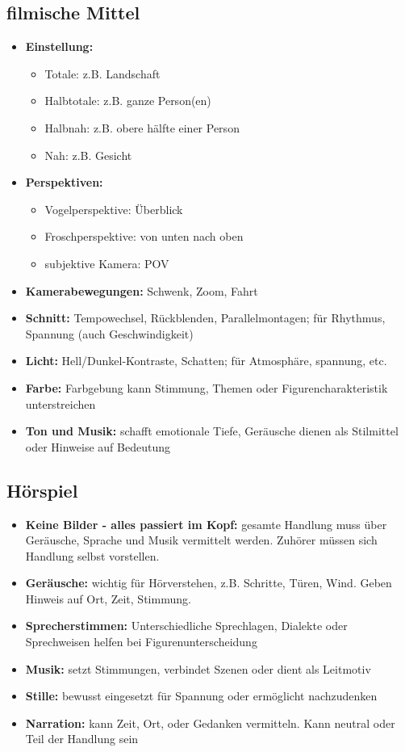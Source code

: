 \subsection{filmische Mittel}
\begin{itemize}
    \item \textbf{Einstellung:} 
        \begin{itemize}
            \item Totale: z.B. Landschaft
            \item Halbtotale: z.B. ganze Person(en)
            \item Halbnah: z.B. obere hälfte einer Person
            \item Nah: z.B. Gesicht
        \end{itemize}
    \item \textbf{Perspektiven:}
        \begin{itemize}
            \item Vogelperspektive: Überblick
            \item Froschperspektive: von unten nach oben
            \item subjektive Kamera: POV
        \end{itemize}
    \item \textbf{Kamerabewegungen:} Schwenk, Zoom, Fahrt
    \item \textbf{Schnitt:} Tempowechsel, Rückblenden, Parallelmontagen; für Rhythmus, Spannung (auch Geschwindigkeit)
    \item \textbf{Licht:} Hell/Dunkel-Kontraste, Schatten; für Atmosphäre, spannung, etc.
    \item \textbf{Farbe:} Farbgebung kann Stimmung, Themen oder Figurencharakteristik unterstreichen
    \item \textbf{Ton und Musik:} schafft emotionale Tiefe, Geräusche dienen als Stilmittel oder Hinweise auf Bedeutung
\end{itemize}


\subsection{Hörspiel}

\begin{itemize}
    \item \textbf{Keine Bilder - alles passiert im Kopf:} gesamte Handlung muss über Geräusche, Sprache und Musik vermittelt werden. Zuhörer müssen sich Handlung selbst vorstellen.
    \item \textbf{Geräusche:} wichtig für Hörverstehen, z.B. Schritte, Türen, Wind. Geben Hinweis auf Ort, Zeit, Stimmung.
    \item \textbf{Sprecherstimmen:} Unterschiedliche Sprechlagen, Dialekte oder Sprechweisen helfen bei Figurenunterscheidung
    \item \textbf{Musik:} setzt Stimmungen, verbindet Szenen oder dient als Leitmotiv
    \item \textbf{Stille:} bewusst eingesetzt für Spannung oder ermöglicht nachzudenken
    \item \textbf{Narration:} kann Zeit, Ort, oder Gedanken vermitteln. Kann neutral oder Teil der Handlung sein
\end{itemize}

